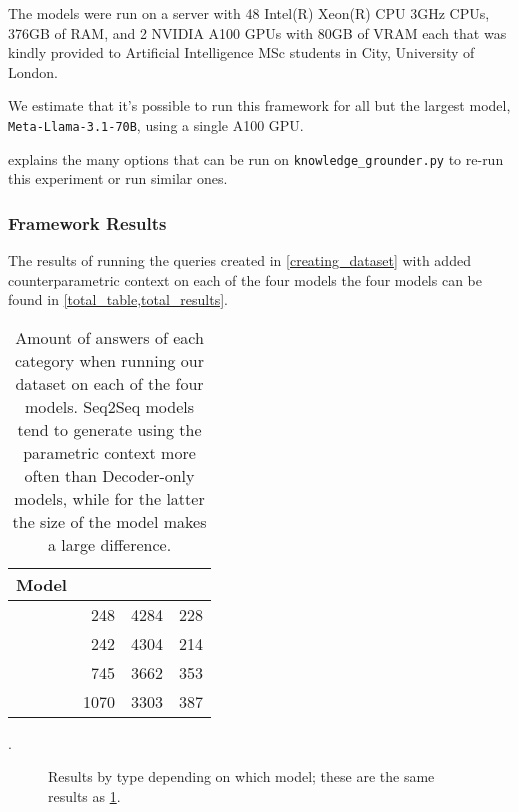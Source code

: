 The models were run on a server with 48 Intel(R) Xeon(R) CPU 3GHz CPUs, 376GB of RAM, and 2 NVIDIA A100 GPUs with 80GB of VRAM each that was kindly provided to Artificial Intelligence MSc students in City, University of London.

We estimate that it's possible to run this framework for all but the largest model, \texttt{Meta-Llama-3.1-70B}, using a single A100 GPU.

 explains the many options that can be run on \texttt{knowledge\_grounder.py} to re-run this experiment or run similar ones.

\subsubsection{Framework Results}
\label{framework_results}

The results of running the queries created in \cref{creating_dataset} with added counterparametric context on each of the four models the four models can be found in \cref{total_table,total_results}.

\begin{table}[htbp]
	\centering
	\scriptsize
	\begin{tabular}{l r r r}
		\toprule
			\bfseries Model & \Parametric{} & \Contextual{} & \Other{} \\
		\midrule
			\smallflan{}  & 248 & 4284 & 228 \\
			\bigflan{} & 242 & 4304 & 214 \\
		\midrule
			\smallllama{} & 745 & 3662 & 353 \\
			\bigllama{} & 1070 & 3303 & 387 \\
		\bottomrule
	\end{tabular}
	\caption{Amount of answers of each category when running our dataset on each of the four models. Seq2Seq models tend to generate using the parametric context more often than Decoder-only models, while for the latter the size of the model makes a large difference.}
	\label{total_table}.
\end{table}

\begin{figure}[ht]
	\centering
	\caption{Results by type depending on which model; these are the same results as \cref{total_table}.}
	\label{total_results}
\end{figure}

